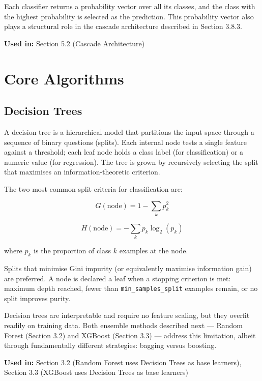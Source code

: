 \documentclass[10pt]{article}
\begin{document}
Each classifier returns a probability vector over all its classes, and the class with the highest probability is selected as the prediction. This probability vector also plays a structural role in the cascade architecture described in Section 3.8.3.

\textbf{Used in:} Section 5.2 (Cascade Architecture)

\section{Core Algorithms}

\subsection{Decision Trees}

A decision tree is a hierarchical model that partitions the input space through a sequence of binary questions (splits). Each internal node tests a single feature against a threshold; each leaf node holds a class label (for classification) or a numeric value (for regression). The tree is grown by recursively selecting the split that maximises an information-theoretic criterion.

The two most common split criteria for classification are:

\begin{equation}
G(\text{node}) = 1 - \sum_k p_k^2
\end{equation}

\begin{equation}
H(\text{node}) = - \sum_k p_k \log_2(p_k)
\end{equation}

where \(p_k\) is the proportion of class \(k\) examples at the node.

Splits that minimise Gini impurity (or equivalently maximise information gain) are preferred. A node is declared a leaf when a stopping criterion is met: maximum depth reached, fewer than \texttt{min\_samples\_split} examples remain, or no split improves purity.

Decision trees are interpretable and require no feature scaling, but they overfit readily on training data. Both ensemble methods described next --- Random Forest (Section 3.2) and XGBoost (Section 3.3) --- address this limitation, albeit through fundamentally different strategies: bagging versus boosting.

\textbf{Used in:} Section 3.2 (Random Forest uses Decision Trees as base learners), Section 3.3 (XGBoost uses Decision Trees as base learners)
\end{document}
